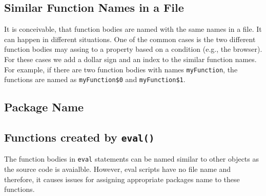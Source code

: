 \documentclass[10pt, preprint]{sigplanconf}
\begin{document}
{\begin{table}
\centering
\caption{JavaScript Expression Reduction to Name.}
 \label{expression-reduction} 
\end{table}    

\subsection{Similar Function Names in a File}
It is conceivable, that function bodies are named with the same names in a file. It can happen in different situations. One of the common cases is the two different function bodies may assing to a property based on a condition (e.g., the browser). For these cases we add a dollar sign and an index to the similar function names. For example, if there are two function bodies with names {\small\texttt{myFunction}}, the functions are named as {\small\texttt{myFunction\$0}} and {\small\texttt{myFunction\$1}}. 


\subsection{Package Name}

\subsection{Functions created by {\large \texttt{eval()}}}}
The function bodies in {\small\texttt{eval}} statements can be named similar to other objects as the source code is avaialble. However, eval scripts have no file name and therefore, it causes issues for assigning appropriate packages name to these functions. 
\end{document}
